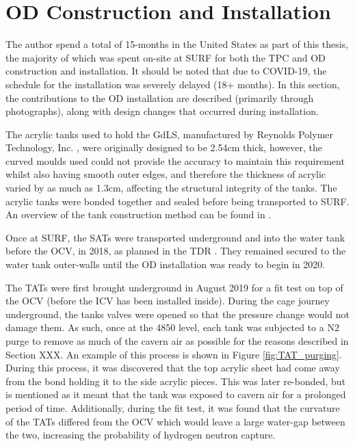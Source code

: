 \section{OD Construction and Installation} \label{sec:od_construction_sec}

\par
The author spend a total of 15-months in the United States as part of this thesis, the majority of which was spent on-site at SURF for both the TPC and OD construction and installation.
It should be noted that due to COVID-19, the schedule for the installation was severely delayed (18+ months).
In this section, the contributions to the OD installation are described (primarily through photographs), along with design changes that occurred during installation.

\par
The acrylic tanks used to hold the GdLS, manufactured by Reynolds Polymer Technology, Inc. \cite{reynolds_acrlyic_ref}, were originally designed to be 2.54cm thick, however, the curved moulds used could not provide the accuracy to maintain this requirement whilst also having smooth outer edges, and therefore the thickness of acrylic varied by as much as 1.3cm, affecting the structural integrity of the tanks.
The acrylic tanks were bonded together and sealed before being transported to SURF.
An overview of the tank construction method can be found in \cite{scotthaselschwardt_thesis_ref}.

\par
Once at SURF, the SATs were transported underground and into the water tank before the OCV, in 2018, as planned in the TDR \cite{LZ_TechnicalDesignReview_ref}.
They remained secured to the water tank outer-walls until the OD installation was ready to begin in 2020. 

\par
The TATs were first brought underground in August 2019 for a fit test on top of the OCV (before the ICV has been installed inside).
During the cage journey underground, the tanks valves were opened so that the pressure change would not damage them.
As such, once at the 4850 level, each tank was subjected to a N2 purge to remove as much of the cavern air as possible for the reasons described in Section XXX.
An example of this process is shown in Figure \ref{fig:TAT_purging}.
During this process, it was discovered that the top acrylic sheet had come away from the bond holding it to the side acrylic pieces.
This was later re-bonded, but is mentioned as it meant that the tank was exposed to cavern air for a prolonged period of time.
Additionally, during the fit test, it was found that the curvature of the TATs differed from the OCV which would leave a large water-gap between the two, increasing the probability of hydrogen neutron capture.

